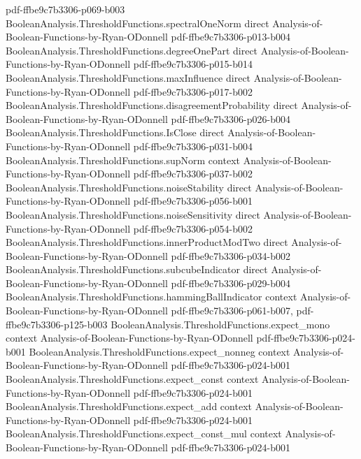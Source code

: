 \begin{theorem}
  {pdf-ffbe9c7b3306-p069-b003}
\proofstep
  {BooleanAnalysis.ThresholdFunctions.spectralOneNorm}
  {direct}
  {Analysis-of-Boolean-Functions-by-Ryan-ODonnell}
  {pdf-ffbe9c7b3306-p013-b004}
\proofstep
  {BooleanAnalysis.ThresholdFunctions.degreeOnePart}
  {direct}
  {Analysis-of-Boolean-Functions-by-Ryan-ODonnell}
  {pdf-ffbe9c7b3306-p015-b014}
\proofstep
  {BooleanAnalysis.ThresholdFunctions.maxInfluence}
  {direct}
  {Analysis-of-Boolean-Functions-by-Ryan-ODonnell}
  {pdf-ffbe9c7b3306-p017-b002}
\proofstep
  {BooleanAnalysis.ThresholdFunctions.disagreementProbability}
  {direct}
  {Analysis-of-Boolean-Functions-by-Ryan-ODonnell}
  {pdf-ffbe9c7b3306-p026-b004}
\proofstep
  {BooleanAnalysis.ThresholdFunctions.IsClose}
  {direct}
  {Analysis-of-Boolean-Functions-by-Ryan-ODonnell}
  {pdf-ffbe9c7b3306-p031-b004}
\proofstep
  {BooleanAnalysis.ThresholdFunctions.supNorm}
  {context}
  {Analysis-of-Boolean-Functions-by-Ryan-ODonnell}
  {pdf-ffbe9c7b3306-p037-b002}
\proofstep
  {BooleanAnalysis.ThresholdFunctions.noiseStability}
  {direct}
  {Analysis-of-Boolean-Functions-by-Ryan-ODonnell}
  {pdf-ffbe9c7b3306-p056-b001}
\proofstep
  {BooleanAnalysis.ThresholdFunctions.noiseSensitivity}
  {direct}
  {Analysis-of-Boolean-Functions-by-Ryan-ODonnell}
  {pdf-ffbe9c7b3306-p054-b002}
\proofstep
  {BooleanAnalysis.ThresholdFunctions.innerProductModTwo}
  {direct}
  {Analysis-of-Boolean-Functions-by-Ryan-ODonnell}
  {pdf-ffbe9c7b3306-p034-b002}
\proofstep
  {BooleanAnalysis.ThresholdFunctions.subcubeIndicator}
  {direct}
  {Analysis-of-Boolean-Functions-by-Ryan-ODonnell}
  {pdf-ffbe9c7b3306-p029-b004}
\proofstep
  {BooleanAnalysis.ThresholdFunctions.hammingBallIndicator}
  {context}
  {Analysis-of-Boolean-Functions-by-Ryan-ODonnell}
  {pdf-ffbe9c7b3306-p061-b007,
    pdf-ffbe9c7b3306-p125-b003}
\proofstep
  {BooleanAnalysis.ThresholdFunctions.expect_mono}
  {context}
  {Analysis-of-Boolean-Functions-by-Ryan-ODonnell}
  {pdf-ffbe9c7b3306-p024-b001}
\proofstep
  {BooleanAnalysis.ThresholdFunctions.expect_nonneg}
  {context}
  {Analysis-of-Boolean-Functions-by-Ryan-ODonnell}
  {pdf-ffbe9c7b3306-p024-b001}
\proofstep
  {BooleanAnalysis.ThresholdFunctions.expect_const}
  {context}
  {Analysis-of-Boolean-Functions-by-Ryan-ODonnell}
  {pdf-ffbe9c7b3306-p024-b001}
\proofstep
  {BooleanAnalysis.ThresholdFunctions.expect_add}
  {context}
  {Analysis-of-Boolean-Functions-by-Ryan-ODonnell}
  {pdf-ffbe9c7b3306-p024-b001}
\proofstep
  {BooleanAnalysis.ThresholdFunctions.expect_const_mul}
  {context}
  {Analysis-of-Boolean-Functions-by-Ryan-ODonnell}
  {pdf-ffbe9c7b3306-p024-b001}
\proofstep

\end{theorem}
